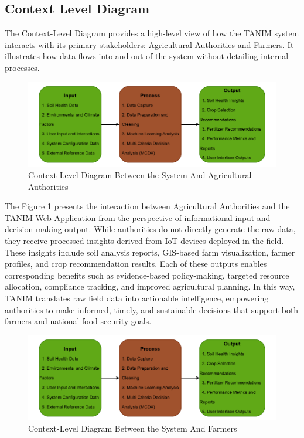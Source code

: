 {	\subsection{Context Level Diagram}
	The Context-Level Diagram provides a high-level view of how the TANIM system interacts with its primary stakeholders: Agricultural Authorities and Farmers. It illustrates how data flows into and out of the system without detailing internal processes.
	
	\begin{figure}[H]
		\centering
		\caption{Context-Level Diagram Between the System And Agricultural Authorities}
		\label{fig:CLDSystem&AgriAuthorities}
		\includegraphics[width=1\textwidth]{figures/IPO.pdf}
	\end{figure}
	
	The Figure \ref{fig:CLDSystem&AgriAuthorities} presents the interaction between Agricultural Authorities and the TANIM Web 	Application from the perspective of informational input and decision-making output. While authorities do not directly generate the raw data, they receive processed insights derived from IoT devices deployed in the field. These insights include soil analysis reports, GIS-based farm visualization, farmer profiles, and crop recommendation results. Each of these outputs enables corresponding benefits such as evidence-based policy-making, targeted resource allocation, compliance tracking, and improved agricultural planning. In this way, TANIM translates raw field data into actionable intelligence, empowering authorities to make informed, timely, and sustainable decisions that support both farmers and national food security goals.
	
	\begin{figure}[H]
		\centering
		\caption{Context-Level Diagram Between the System And Farmers}
		\label{fig:CLDSystem&Farmers}
		\includegraphics[width=1\textwidth]{figures/IPO.pdf}
	\end{figure}
	
}
